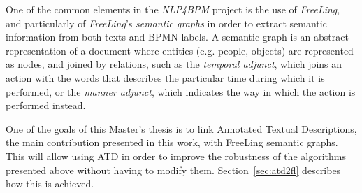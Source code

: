 One of the common elements in the \emph{NLP4BPM} project is the use of
\emph{FreeLing}, and particularly of \emph{FreeLing}'s \emph{semantic graphs} in
order to extract semantic information from both texts and BPMN labels. A
semantic graph is an abstract representation of a document where entities (e.g.
people, objects) are represented as nodes, and joined by relations, such as the
\emph{temporal adjunct}, which joins an action with the words that describes the
particular time during which it is performed, or the \emph{manner adjunct},
which indicates the way in which the action is performed instead.

One of the goals of this Master's thesis is to link Annotated Textual
Descriptions, the main contribution presented in this work, with FreeLing
semantic graphs. This will allow using ATD in order to improve the robustness of
the algorithms presented above without having to modify them.
Section~\ref{sec:atd2fl} describes how this is achieved.


